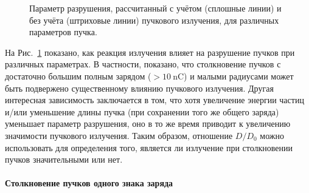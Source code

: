 \begin{figure}[ht]
    \caption[Параметр разрушения, рассчитанный с учётом и без учёта пучкового излучения, для различных параметров пучка]{\label{fig:ch3/Q_disruption} 
    Параметр разрушения, рассчитанный с учётом (сплошные линии) и без учёта (штриховые линии) пучкового излучения, для различных параметров пучка.}
\end{figure}

На Рис.~\ref{fig:ch3/Q_disruption} показано, как реакция излучения влияет на разрушение пучков при различных параметрах.
В частности, показано, что столкновение пучков с достаточно большим полным зарядом ($> \SI{10}{\nano\coulomb}$) и малыми радиусами может быть подвержено существенному влиянию пучкового излучения.
Другая интересная зависимость заключается в том, что хотя увеличение энергии частиц и/или уменьшение длины пучка (при сохранении того же общего заряда) уменьшает параметр разрушения, оно в то же время приводит к увеличению значимости пучкового излучения.
Таким образом, отношение $D/D_0$ можно использовать для определения того, является ли излучение при столкновении пучков значительными или нет.

\paragraph{Столкновение пучков одного знака заряда}

